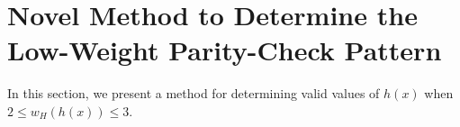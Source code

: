\section{Novel Method to Determine the Low-Weight Parity-Check Pattern}
\label{sec3}
In this section, %
we present a method for determining valid values of $h(x)$ when $2 \leq w_H(h(x))\leq 3$. 

%






